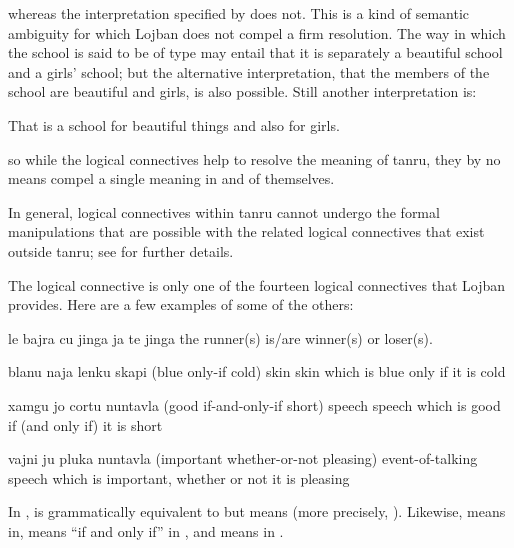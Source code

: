 {\noindent}whereas the interpretation specified by  does not. This is a kind of
    semantic ambiguity for which Lojban does not compel a firm
    resolution. The way in which the school is said to be of type
     may entail that it is separately a
    beautiful school and a girls' school; but the alternative
    interpretation, that the members of the school are beautiful
    and girls, is also possible. Still another interpretation is:
\begin{example}
That is a school for beautiful things\n
\T	and also for girls.
\end{example}

{\noindent}so while the logical connectives help to resolve the meaning of
    tanru, they by no means compel a single meaning in and of
    themselves. 

In general, logical connectives within tanru cannot undergo
    the formal manipulations that are possible with the related
    logical connectives that exist outside tanru; see  for further details.

The logical connective  is only one of the fourteen
    logical connectives that Lojban provides. Here are a few
    examples of some of the others:
\begin{example}
le bajra cu jinga ja te jinga\n
the runner(s) is/are winner(s) or loser(s).
\end{example}

\begin{example}
blanu naja lenku skapi\n
(blue only-if cold) skin\n
skin which is blue only if it is cold
\end{example}

\begin{example}
xamgu jo cortu nuntavla\n
(good if-and-only-if short) speech\n
speech which is good if (and only if) it is short
\end{example}

\begin{example}
vajni ju pluka nuntavla\n
(important whether-or-not pleasing) event-of-talking\n
speech which is important, whether or not it is pleasing
\end{example}

In ,  is
    grammatically equivalent to  but means  (more
    precisely, ). Likewise,  means  in,  means ``if and only
    if'' in , and  means
     in .

